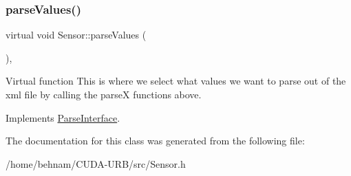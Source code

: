 \subsubsection{\texorpdfstring{parse\+Values()}{parseValues()}}
{\footnotesize\ttfamily virtual void Sensor\+::parse\+Values (\begin{DoxyParamCaption}{ }\end{DoxyParamCaption})\hspace{0.3cm}{\ttfamily [inline]}, {\ttfamily [virtual]}}

Virtual function This is where we select what values we want to parse out of the xml file by calling the parseX functions above. 

Implements \hyperlink{classParseInterface_afca32108192ba0997c9e5a78189b0cbc}{Parse\+Interface}.



The documentation for this class was generated from the following file\+:\begin{DoxyCompactItemize}
\item 
/home/behnam/\+C\+U\+D\+A-\/\+U\+R\+B/src/Sensor.\+h\end{DoxyCompactItemize}
